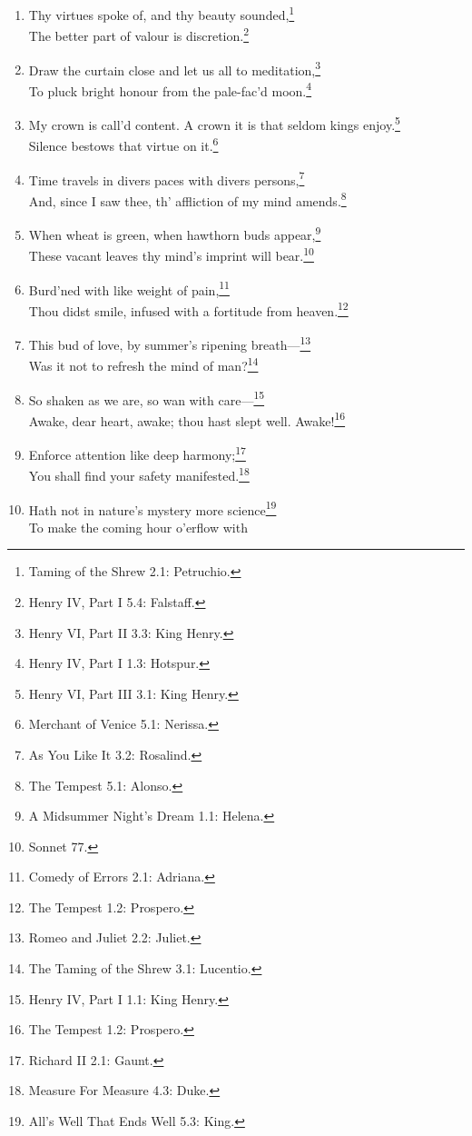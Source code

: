 \documentclass[17pt,twoside]{extarticle}
\begin{document}
\begin{enumerate}
  untie.\footnote{Troilus and Cressida 2.3: Ulysses.}
\item
  Thy virtues spoke of, and thy beauty sounded,\footnote{Taming of the
    Shrew 2.1: Petruchio.}\\The better part of valour is
  discretion.\footnote{Henry IV, Part I 5.4: Falstaff.}
\item
  Draw the curtain close and let us all to meditation,\footnote{Henry
    VI, Part II 3.3: King Henry.}\\To pluck bright honour from the
  pale-fac'd moon.\footnote{Henry IV, Part I 1.3: Hotspur.}
\item
  My crown is call'd content. A crown it is that seldom kings
  enjoy.\footnote{Henry VI, Part III 3.1: King Henry.}\\Silence bestows
  that virtue on it.\footnote{Merchant of Venice 5.1: Nerissa.}
\item
  Time travels in divers paces with divers persons,\footnote{As You Like
    It 3.2: Rosalind.}\\And, since I saw thee, th' affliction of my mind
  amends.\footnote{The Tempest 5.1: Alonso.}
\item
  When wheat is green, when hawthorn buds appear,\footnote{A Midsummer
    Night's Dream 1.1: Helena.}\\These vacant leaves thy mind's imprint
  will bear.\footnote{Sonnet 77.}
\item
  Burd'ned with like weight of pain,\footnote{Comedy of Errors 2.1:
    Adriana.}\\Thou didst smile, infused with a fortitude from
  heaven.\footnote{The Tempest 1.2: Prospero.}
\item
  This bud of love, by summer's ripening breath---\footnote{Romeo and
    Juliet 2.2: Juliet.}\\Was it not to refresh the mind of
  man?\footnote{The Taming of the Shrew 3.1: Lucentio.}
\item
  So shaken as we are, so wan with care---\footnote{Henry IV, Part I
    1.1: King Henry.}\\Awake, dear heart, awake; thou hast slept well.
  Awake!\footnote{The Tempest 1.2: Prospero.}
\item
  Enforce attention like deep harmony;\footnote{Richard II 2.1: Gaunt.}\\You
  shall find your safety manifested.\footnote{Measure For Measure 4.3:
    Duke.}
\item
  Hath not in nature's mystery more science\footnote{All's Well That
    Ends Well 5.3: King.}\\To make the coming hour o'erflow with

\end{enumerate}
\end{document}
